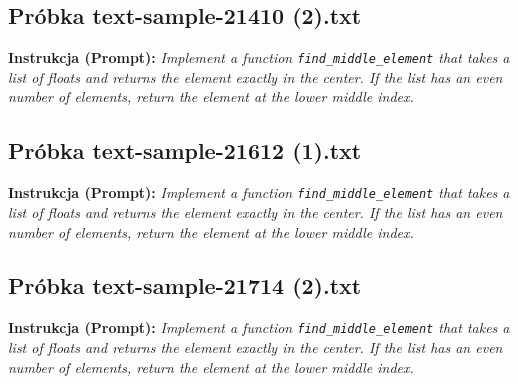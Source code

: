 \subsection{Próbka text-sample-21410 (2).txt}
\label{sec:lst:text-sample-21410-2}
\textbf{Instrukcja (Prompt):} \textit{Implement a function \texttt{find\_middle\_element} that takes a list of floats and returns the element exactly in the center. If the list has an even number of elements, return the element at the lower middle index.}




\subsection{Próbka text-sample-21612 (1).txt}
\label{sec:lst:text-sample-21612-1}
\textbf{Instrukcja (Prompt):} \textit{Implement a function \texttt{find\_middle\_element} that takes a list of floats and returns the element exactly in the center. If the list has an even number of elements, return the element at the lower middle index.}




\subsection{Próbka text-sample-21714 (2).txt}
\label{sec:lst:text-sample-21714-2}
\textbf{Instrukcja (Prompt):} \textit{Implement a function \texttt{find\_middle\_element} that takes a list of floats and returns the element exactly in the center. If the list has an even number of elements, return the element at the lower middle index.}




